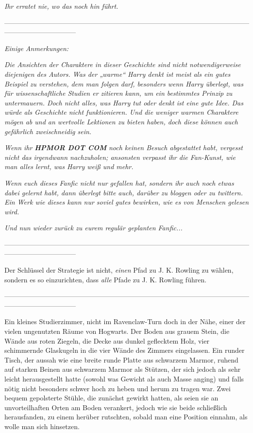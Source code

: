 {\hfill\break

\emph{Ihr erratet nie, wo das noch hin führt.}

\hfill\break

--------------------------------------------------------------------------------------------------------------------------------------------

\hfill\break

\emph{\emph{Einige Anmerkungen:}}

\hfill\break \emph{Die Ansichten der Charaktere in dieser Geschichte sind nicht notwendigerweise diejenigen des Autors. Was der „warme“ Harry denkt ist} \emph{\emph{meist}} \emph{als ein gutes Beispiel zu verstehen, dem man folgen darf, besonders wenn Harry überlegt, was für wissenschaftliche Studien er zitieren kann, um ein bestimmtes Prinzip zu untermauern. Doch nicht alles, was Harry tut oder denkt ist eine gute Idee. Das würde als Geschichte nicht funktionieren. Und die weniger warmen Charaktere mögen ab und an wertvolle Lektionen zu bieten haben, doch diese können auch gefährlich zweischneidig sein.}

\emph{Wenn ihr} \emph{\textbf{HPMOR DOT COM}} \emph{noch keinen Besuch abgestattet habt, vergesst nicht das irgendwann nachzuholen; ansonsten verpasst ihr die Fan-Kunst, wie man alles lernt, was Harry weiß und mehr.}

\emph{Wenn euch dieses Fanfic nicht nur gefallen hat, sondern ihr auch noch etwas dabei gelernt habt, dann überlegt bitte auch, darüber zu bloggen oder zu twittern. Ein Werk wie dieses kann nur soviel gutes bewirken, wie es von Menschen gelesen wird.}

\emph{\emph{Und nun wieder zurück zu eurem regulär geplanten Fanfic...}}

\hfill\break

--------------------------------------------------------------------------------------------------------------------------------------------

\hfill\break Der Schlüssel der Strategie ist nicht, \emph{einen} Pfad zu J. K. Rowling zu wählen, sondern es so einzurichten, dass \emph{alle} Pfade zu J. K. Rowling führen.

--------------------------------------------------------------------------------------------------------------------------------------------

\hfill\break Ein kleines Studierzimmer, nicht im Ravenclaw-Turn doch in der Nähe, einer der vielen ungenutzten Räume von Hogwarts. Der Boden aus grauem Stein, die Wände aus roten Ziegeln, die Decke aus dunkel geflecktem Holz, vier schimmernde Glaskugeln in die vier Wände des Zimmers eingelassen. Ein runder Tisch, der aussah wie eine breite runde Platte aus schwarzem Marmor, ruhend auf starken Beinen aus schwarzem Marmor als Stützen, der sich jedoch als sehr leicht herausgestellt hatte (sowohl was Gewicht als auch Masse anging) und falls nötig nicht besonders schwer hoch zu heben und herum zu tragen war. Zwei bequem gepolsterte Stühle, die zunächst gewirkt hatten, als seien sie an unvorteilhaften Orten am Boden verankert, jedoch wie sie beide schließlich herausfanden, zu einem herüber rutschten, sobald man eine Position einnahm, als wolle man sich hinsetzen.

}
